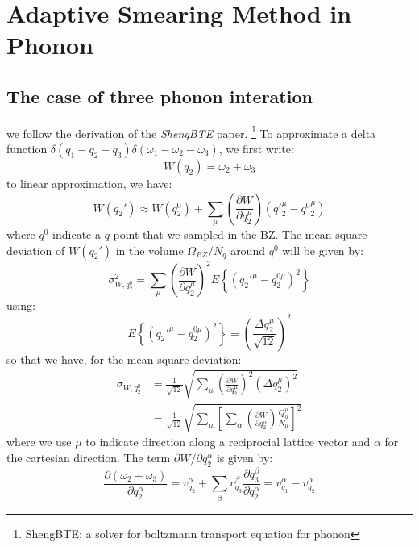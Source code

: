\documentclass{article}
\newcommand{\pfrac}[2]{\frac{\partial #1}{\partial #2}}
\begin{document}
\section{Adaptive Smearing Method in Phonon}

\subsection{The case of three phonon interation}
we follow the derivation of the \emph{ShengBTE} paper. 
\footnote{ShengBTE: a solver for boltzmann transport equation for phonon}
To approximate a delta function $\delta(q_1 - q_2 -q_3)\delta(\omega_1 - \omega_2 - \omega_3)$, we 
first write:
\begin{equation}
    W(q_2) = \omega_2 + \omega_3
\end{equation}
to linear approximation, we have:
\begin{equation}
    W(q_2') \approx W(q_2^0) + \sum_\mu \left( \pfrac{W}{q_2^{\mu}} \right) \left( {q'}_2^{\mu} - {q^0}_2^{\mu}\right) \label{3ph}
\end{equation}
where $q^0$ indicate a $q$ point that we sampled in the BZ. The mean square deviation of $W(q_2')$
in the volume $\Omega_{BZ} / N_q$ around $q^0$ will be given by:
\begin{equation}
    \sigma^2_{W,q_2^0} = \sum_\mu \left( \pfrac{W}{q_2^{\mu}} \right)^2 E\left\{ \left( q_2'^{\mu} - q_2^{0\mu}\right)^2 \right\}
\end{equation}
using:
\begin{equation}
    E\left\{ \left( q_2'^{\mu} - q_2^{0\mu}\right)^2 \right\} 
        = \left( \frac{ \Delta q_2^{\mu} }{\sqrt{12}} \right)^2
\end{equation}
so that we have, for the mean square deviation:
\begin{align}
    \sigma_{W,q_2^0} &= \frac{1}{\sqrt{12}} \sqrt{ \sum_\mu \left( \pfrac{W}{q_2^{\mu}} \right)^2
                            ( \Delta q_2^{\mu} )^2  } \\
        &= \frac{1}{\sqrt{12}} \sqrt{ \sum_\mu \left[ \sum_{\alpha}\left( \pfrac{W}{q_2^{\alpha}} \right)
                 \frac{Q_{\alpha}^{\mu}}{ N_{\mu}}  \right]^2  }
\end{align}
where we use $\mu$ to indicate direction along a reciprocial lattice vector 
and $\alpha$ for the cartesian direction.
The term $ \partial W / \partial q_2^{\alpha}$ is given by:
\begin{equation}
   \frac{ \partial(\omega_2 + \omega_3) } {\partial q_2^{\alpha} } 
    = v_{q_2}^{\alpha} + \sum_{\beta} v_{q_3}^{\beta} \frac{\partial q_3^{\beta}}{\partial q_2^{\alpha}}
    = v_{q_1}^{\alpha} - v_{q_2}^{\alpha}
\end{equation}
\end{document}
